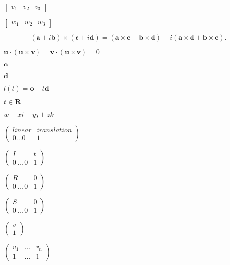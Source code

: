 \documentclass{article}
\begin{document}
$ \begin{bmatrix} v_1 & v_2 & v_3 \end{bmatrix} $
\pagebreak

$ \begin{bmatrix} w_1 & w_2 & w_3
\end{bmatrix} $
\pagebreak

\[ (\mathbf{a}+i\mathbf{b}) \times (\mathbf{c}+i\mathbf{d}) = (\mathbf{a} \times \mathbf{c} - \mathbf{b} \times
\mathbf{d}) - i(\mathbf{a} \times \mathbf{d} + \mathbf{b} \times \mathbf{c}).\]
\pagebreak

$\mathbf{u} \cdot (\mathbf{u} \times \mathbf{v}) =
\mathbf{v} \cdot (\mathbf{u} \times \mathbf{v}) = 0$
\pagebreak

$ \mathbf{o} $
\pagebreak

$ \mathbf{d} $
\pagebreak

$ l(t) = \mathbf{o} + t \mathbf{d} $
\pagebreak

$ t \in \mathbf{R} $
\pagebreak

$ w+xi+yj+zk $
\pagebreak

$ \left( \begin{array}{cc}
 linear & translation\\
 0 ... 0 & 1
 \end{array} \right) $
\pagebreak

$ \left( \begin{array}{cc}
 I & t \\
 0\,...\,0 & 1
 \end{array} \right) $
\pagebreak

$ \left( \begin{array}{cc}
 R & 0\\
 0\,...\,0 & 1
 \end{array} \right) $
\pagebreak

$ \left( \begin{array}{cc}
 S & 0\\
 0\,...\,0 & 1
 \end{array} \right) $
\pagebreak

$ \left( \begin{array}{c}
 v\\
 1
 \end{array} \right) $
\pagebreak

$ \left( \begin{array}{ccc}
 v_1 & ... & v_n\\
 1 & ... & 1
 \end{array} \right) $
\pagebreak
\end{document}
